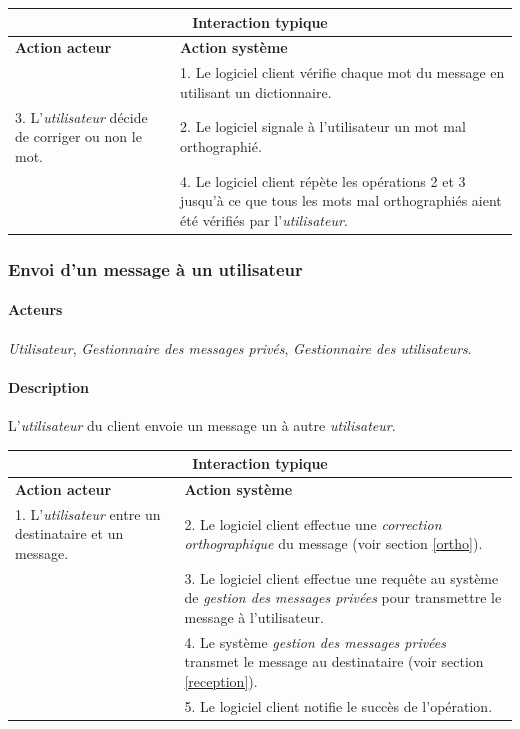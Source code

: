 \documentclass[a4paper]{article}
\begin{document}
    \begin{center}
        \begin{tabular}{|p{6cm}|p{6cm}|}
            \hline
            \multicolumn{2}{|c|}{\textbf{Interaction typique}} \\ \hline
            \textbf{Action acteur} & \textbf{Action système} \\ \hline
            & 1. Le logiciel client vérifie chaque mot du message en utilisant
            un dictionnaire. \\
            3. L'\textit{utilisateur} décide de corriger ou non le mot.
            & 2. Le logiciel signale à l'utilisateur un mot mal orthographié. \\
            & 4. Le logiciel client répète les opérations 2 et 3 jusqu'à ce que
            tous les mots mal orthographiés aient été vérifiés par 
            l'\textit{utilisateur}. \\
            \hline
        \end{tabular}
    \end{center}

   \subsubsection{Envoi d'un message à un utilisateur}

    \paragraph{Acteurs} \textit{Utilisateur},
    \textit{Gestionnaire des messages privés},
    \textit{Gestionnaire des utilisateurs}.

    \paragraph{Description} L'\textit{utilisateur} du client envoie un message
    un à autre \textit{utilisateur}.

    \begin{center}
        \begin{tabular}{|p{6cm}|p{6cm}|}
            \hline
            \multicolumn{2}{|c|}{\textbf{Interaction typique}} \\ \hline
            \textbf{Action acteur} & \textbf{Action système} \\ \hline
            1. L'\textit{utilisateur} entre un destinataire et un message.
            & 2. Le logiciel client effectue une
            \textit{correction orthographique} du message (voir section
            \ref{ortho}). \\
            & 3. Le logiciel client effectue une requête au système de
            \textit{gestion des messages privées} pour transmettre le message
            à l'utilisateur. \\
            & 4. Le système \textit{gestion des messages privées} transmet le
            message au destinataire (voir section \ref{reception}). \\
            & 5. Le logiciel client notifie le succès de l'opération. \\
            \hline
        \end{tabular}
    \end{center}
\end{document}
